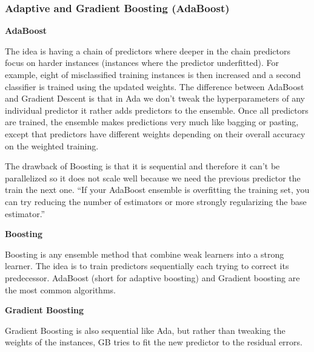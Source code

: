 \documentclass[11pt]{article}
\theoremstyle{definition}
\theoremstyle{remark}
\begin{document}
{\subsubsection{Adaptive and Gradient Boosting (AdaBoost)}
\textbf{AdaBoost}

The idea is having a chain of predictors where deeper in the chain predictors focus on harder instances (instances where the predictor underfitted). For example, eight of misclassified training instances is then increased and a second classifier is trained using the updated weights. The difference between AdaBoost and Gradient Descent is that in Ada we don't tweak the hyperparameters of any individual predictor it rather adds predictors to the ensemble. Once all predictors are trained, the ensemble makes predictions very much like bagging or pasting, except that predictors have different weights depending on their overall accuracy on the weighted training.

The drawback of Boosting is that it is sequential and therefore it can't be parallelized so it does not scale well because we need the previous predictor the train the next one.
“If your AdaBoost ensemble is overfitting the training set, you can try reducing the number of estimators or more strongly regularizing the base estimator.”

\textbf{Boosting}

Boosting is any ensemble method that combine weak learners into a strong learner. The idea is to train predictors sequentially each trying to correct its predecessor. AdaBoost (short for adaptive boosting) and Gradient boosting are the most common algorithms.

\textbf{Gradient Boosting}

Gradient Boosting is also sequential like Ada, but rather than tweaking the weights of the instances, GB tries to fit the new predictor to the residual errors.

}
\end{document}
